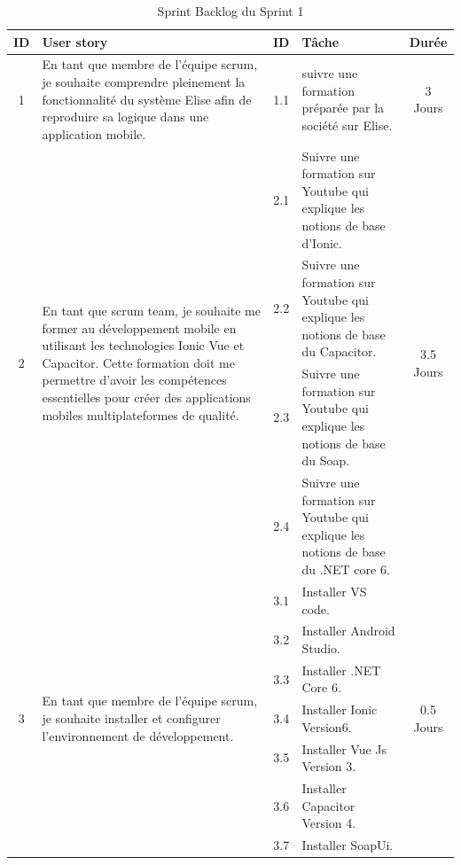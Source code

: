 \begin{adjustwidth}{-1cm}{}
    
    \begin{longtable}{|c|p{6cm}|c|p{6cm}|c|}
      \caption{Sprint Backlog du Sprint 1} \label{tab:sprint-backlog-1} \\
      \hline
      \textbf{ID} & \textbf{User story} & \textbf{ID}  & \textbf{Tâche} & \textbf{Durée} \\
      \hline

    1 & En tant que membre de l'équipe scrum, je
    souhaite comprendre pleinement la fonctionnalité du système Elise afin de reproduire sa logique dans une application mobile. &  1.1 &suivre une formation préparée par la société sur Elise.&3 Jours\\
    \cline{1-5}
    \multirow{4}{*}{2} & \multirow{4}{6cm}{En tant que scrum team, je souhaite me former au développement mobile en utilisant les technologies Ionic Vue et Capacitor. Cette formation doit me permettre d'avoir les compétences essentielles pour créer des applications mobiles multiplateformes de qualité.}  &  2.1 &Suivre une formation sur Youtube qui explique les notions de base d'Ionic.&\multirow{4}{2cm}{3.5 Jours}\\
    \cline{3-4}
    &  &  2.2 &Suivre une formation sur Youtube qui explique les notions de base du Capacitor.&\\
    \cline{3-4}
    &  &  2.3 &Suivre une formation sur Youtube qui explique les notions de base du Soap.&\\
    \cline{3-4}
    &  &  2.4 &Suivre une formation sur Youtube qui explique les notions de base du .NET core 6.&\\
    \cline{1-5}
    \multirow{7}{*}{3} & \multirow{7}{6cm}{En tant que membre de l'équipe scrum, je souhaite installer et configurer l'environnement de développement.} &  3.1 &Installer VS code.&\multirow{7}{2cm}{0.5 Jours}\\
    \cline{3-4}
    &  &  3.2 &Installer Android Studio.&\\
    \cline{3-4}
    &  &  3.3 &Installer .NET Core 6.&\\
    \cline{3-4}
    &  &  3.4 &Installer Ionic Version6.&\\
    \cline{3-4}
    &  &  3.5 &Installer Vue Js Version 3.&\\
    \cline{3-4}
    &  &  3.6 &Installer Capacitor Version 4.&\\
    \cline{3-4}
    &  &  3.7 &Installer SoapUi.&\\

\end{longtable}
\end{adjustwidth}
